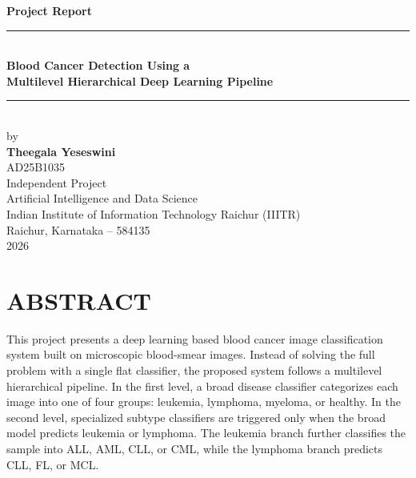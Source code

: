 \documentclass[12pt,a4paper]{report}
\newcommand{\templchapter}[1]{%
    \section*{#1}%
    \addcontentsline{toc}{section}{#1}%
}
\begin{document}
\justifying

\begin{titlepage}
\begin{center}
\vspace*{0.8cm}

{\Large \textbf{Project Report}}\\[0.8cm]

\rule{0.85\textwidth}{0.8pt}\\[0.5cm]
{\Huge \textbf{Blood Cancer Detection Using a}}\\[0.25cm]
{\Huge \textbf{Multilevel Hierarchical Deep Learning Pipeline}}\\[0.5cm]
\rule{0.85\textwidth}{0.8pt}\\[0.9cm]

{\large by}\\[0.6cm]

{\Large \textbf{Theegala Yeseswini}}\\[0.15cm]
{\large AD25B1035}\\[0.9cm]

{\large Independent Project}\\[0.2cm]
{\large Artificial Intelligence and Data Science}\\[0.6cm]

{\large Indian Institute of Information Technology Raichur (IIITR)}\\[0.2cm]
{\large Raichur, Karnataka -- 584135}\\[0.9cm]

{\large 2026}

\vfill
\end{center}
\end{titlepage}

\tableofcontents
\clearpage


\templchapter{ABSTRACT}
This project presents a deep learning based blood cancer image classification system built on microscopic blood-smear images. Instead of solving the full problem with a single flat classifier, the proposed system follows a multilevel hierarchical pipeline. In the first level, a broad disease classifier categorizes each image into one of four groups: leukemia, lymphoma, myeloma, or healthy. In the second level, specialized subtype classifiers are triggered only when the broad model predicts leukemia or lymphoma. The leukemia branch further classifies the sample into ALL, AML, CLL, or CML, while the lymphoma branch predicts CLL, FL, or MCL.
\end{document}
